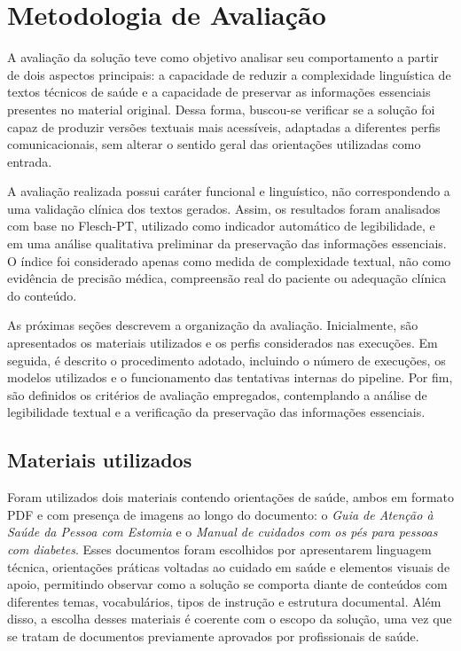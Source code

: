 \chapter{Metodologia de Avaliação}
\label{cap:metodologia-avaliacao}

A avaliação da solução teve como objetivo analisar seu comportamento a partir de dois aspectos principais: a capacidade de reduzir a complexidade linguística de textos técnicos de saúde e a capacidade de preservar as informações essenciais presentes no material original. Dessa forma, buscou-se verificar se a solução foi capaz de produzir versões textuais mais acessíveis, adaptadas a diferentes perfis comunicacionais, sem alterar o sentido geral das orientações utilizadas como entrada.

A avaliação realizada possui caráter funcional e linguístico, não correspondendo a uma validação clínica dos textos gerados. Assim, os resultados foram analisados com base no Flesch-PT, utilizado como indicador automático de legibilidade, e em uma análise qualitativa preliminar da preservação das informações essenciais. O índice foi considerado apenas como medida de complexidade textual, não como evidência de precisão médica, compreensão real do paciente ou adequação clínica do conteúdo.

As próximas seções descrevem a organização da avaliação. Inicialmente, são apresentados os materiais utilizados e os perfis considerados nas execuções. Em seguida, é descrito o procedimento adotado, incluindo o número de execuções, os modelos utilizados e o funcionamento das tentativas internas do pipeline. Por fim, são definidos os critérios de avaliação empregados, contemplando a análise de legibilidade textual e a verificação da preservação das informações essenciais.

\section{Materiais utilizados}
\label{sec:materiais-utlizados}

Foram utilizados dois materiais contendo orientações de saúde, ambos em formato PDF e com presença de imagens ao longo do documento: o \textit{Guia de Atenção à Saúde da Pessoa com Estomia} e o \textit{Manual de cuidados com os pés para pessoas com diabetes}. Esses documentos foram escolhidos por apresentarem linguagem técnica, orientações práticas voltadas ao cuidado em saúde e elementos visuais de apoio, permitindo observar como a solução se comporta diante de conteúdos com diferentes temas, vocabulários, tipos de instrução e estrutura documental. Além disso, a escolha desses materiais é coerente com o escopo da solução, uma vez que se tratam de documentos previamente aprovados por profissionais de saúde.

